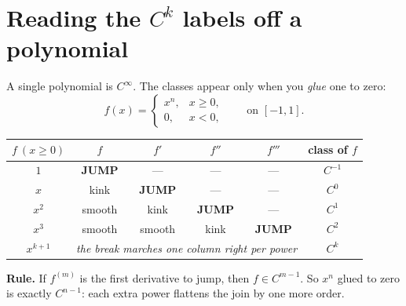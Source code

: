 \documentclass[11pt]{article}
\begin{document}
\section{Reading the $C^{k}$ labels off a polynomial}

A single polynomial is $C^{\infty}$. The classes appear only when you
\emph{glue} one to zero:
\begin{equation}\label{eq:trunc}
  f(x)=\begin{cases} x^{n}, & x\ge 0,\\ 0, & x<0,\end{cases}
  \qquad\text{on } [-1,1].
\end{equation}

\begin{center}\small
\renewcommand{\arraystretch}{1.25}
\begin{tabular}{@{}c cccc c@{}}
\toprule
$f\ (x\ge0)$ & $f$ & $f'$ & $f''$ & $f'''$ & \textbf{class of $f$}\\
\midrule
$1$       & \textcolor{PitFrame}{\textbf{JUMP}} & --- & --- & --- & $C^{-1}$\\
$x$       & kink & \textcolor{PitFrame}{\textbf{JUMP}} & --- & --- & $C^{0}$\\
$x^{2}$   & smooth & kink & \textcolor{PitFrame}{\textbf{JUMP}} & --- & $C^{1}$\\
$x^{3}$   & smooth & smooth & kink & \textcolor{PitFrame}{\textbf{JUMP}} & $C^{2}$\\
\midrule
$x^{k+1}$ & \multicolumn{4}{c}{\emph{the break marches one column right per power}} & $C^{k}$\\
\bottomrule
\end{tabular}
\end{center}

\noindent
\textbf{Rule.} If $f^{(m)}$ is the first derivative to jump, then
$f\in C^{m-1}$. So $x^{n}$ glued to zero is exactly $C^{n-1}$: each extra power
flattens the join by one more order.
\end{document}
